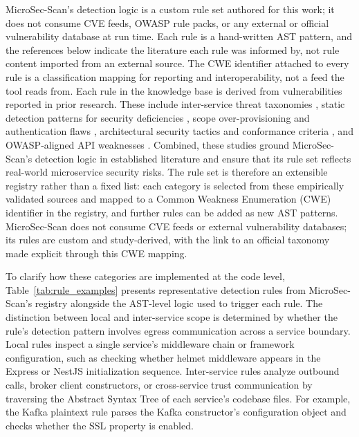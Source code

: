 \documentclass[preprint,12pt]{elsarticle}
\newcommand{\new}[1]{#1}
\begin{document}
\new{MicroSec-Scan's detection logic is a custom rule set authored for this
work; it does not consume CVE feeds, OWASP rule packs, or any external or
official vulnerability database at run time. Each rule is a hand-written AST
pattern, and the references below indicate the literature each rule was
informed by, not rule content imported from an external source. The CWE
identifier attached to every rule is a classification mapping for reporting
and interoperability, not a feed the tool reads from.}
Each rule in the knowledge base is derived from vulnerabilities reported in prior research. These include inter-service threat taxonomies \cite{haindl2024systematic}, static detection patterns for security deficiencies \cite{unver2023pomegranate}, scope over-provisioning and authentication flaws \cite{kalubowila2021optimization}, architectural security tactics and conformance criteria \cite{zdun2024tactics}, and OWASP-aligned API weaknesses \cite{mujahid2024owasp}. Combined, these studies ground MicroSec-Scan’s detection logic in established literature and ensure that its rule set reflects real-world microservice security risks. \new{The rule set is therefore an extensible registry rather than a fixed list: each category is selected from these empirically validated sources and mapped to a Common Weakness Enumeration (CWE) identifier in the registry, and further rules can be added as new AST patterns. MicroSec-Scan does not consume CVE feeds or external vulnerability databases; its rules are custom and study-derived, with the link to an official taxonomy made explicit through this CWE mapping.}

To clarify how these categories are implemented at the code level, Table~\ref{tab:rule_examples} presents representative detection rules from MicroSec-Scan's registry alongside the AST-level logic used to trigger each rule. The distinction between local and inter-service scope is determined by whether the rule's detection pattern involves egress communication across a service boundary. Local rules inspect a single service's middleware chain or framework configuration, such as checking whether helmet middleware appears in the Express or NestJS initialization sequence. Inter-service rules analyze outbound calls, broker client constructors, or cross-service trust communication by traversing the Abstract Syntax Tree of each service's codebase files. For example, the Kafka plaintext rule parses the Kafka constructor's configuration object and checks whether the SSL property is enabled. 
\end{document}
